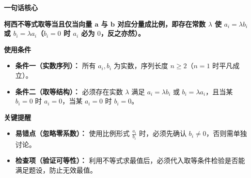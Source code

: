 \begin{summarybox}
	\textbf{\textcolor{CSummary}{一句话核心}}

	\textbf{柯西不等式取等当且仅当向量 $\boldsymbol{a}$ 与 $\boldsymbol{b}$ 对应分量成比例，即存在常数 $\lambda$ 使 $a_i=\lambda b_i$ 或 $b_i=\lambda a_i$（$b_i=0$ 时 $a_i$ 必为 $0$，反之亦然）。}

	\medskip
	\textbf{\textcolor{CSummary}{使用条件}}
	\begin{itemize}[leftmargin=*, itemsep=0.5em, topsep=0.4em]
		\item \textbf{条件一（实数序列）：} 所有 $a_i,b_i$ 为实数，序列长度 $n\ge 2$（$n=1$ 时平凡成立）。
		\item \textbf{条件二（取等结构）：} 必须存在实数 $\lambda$ 满足 $a_i=\lambda b_i$ 或 $b_i=\lambda a_i$，且当某 $b_i=0$ 时 $a_i=0$，当某 $a_i=0$ 时 $b_i=0$。
	\end{itemize}

	\medskip
	\textbf{\textcolor{CSummary}{关键提醒}}
	\begin{itemize}[leftmargin=*, itemsep=0.5em, topsep=0.4em]
		\item \textbf{易错点（忽略零系数）：} 使用比例形式 $\frac{a_i}{b_i}$ 时，必须先确认 $b_i\neq 0$，否则需单独讨论。
		\item \textbf{检查项（验证可等性）：} 利用不等式求最值后，必须代入取等条件检验是否能满足题设，防止无效最值。
	\end{itemize}
\end{summarybox}
